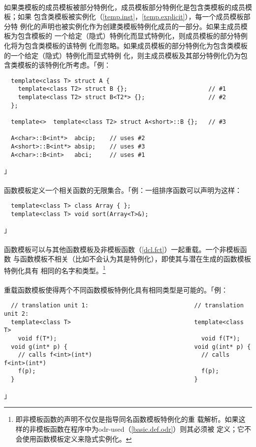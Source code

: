 \paragraph{}
如果类模板的成员模板被部分特例化，成员模板部分特例化是包含类模板的成员模板；如果
包含类模板被实例化（\ref{temp.inst}，\ref{temp.explicit}），每一个成员模板部分特
例化的声明也被实例化作为创建类模板特例化成员的一部分。如果主成员模板为包含模板的
一个给定（隐式）特例化而显式特例化，则成员模板的部分特例化将为包含类模板的该特例
化而忽略。如果成员模板的部分特例化为包含类模板的一个给定（隐式）特例化而显式特例
化，则主成员模板及其部分特例化仍为包含类模板的该特例化所考虑。「例：
\begin{lstlisting}
  template<class T> struct A {
    template<class T2> struct B {};                       // #1
    template<class T2> struct B<T2*> {};                  // #2
  };

  template<>  template<class T2> struct A<short>::B {};   // #3

  A<char>::B<int*>  abcip;    // uses #2
  A<short>::B<int*> absip;    // uses #3
  A<char>::B<int>   abci;     // uses #1
\end{lstlisting}」

\paragraph{}
函数模板定义一个相关函数的无限集合。「例：一组排序函数可以声明为这样：
\begin{lstlisting}
  template<class T> class Array { };
  template<class T> void sort(Array<T>&);
\end{lstlisting}」

\paragraph{}
函数模板可以与其他函数模板及非模板函数（\ref{dcl.fct}）一起重载。一个非模板函数
与函数模板不相关（比如不会认为其是特例化），即使其与潜在生成的函数模板特例化具有
相同的名字和类型。\footnote{即非模板函数的声明不仅仅是指导同名函数模板特例化的重
载解析。如果这样的非模板函数在程序中为odr-used（\ref{basic.def.odr}）则其必须被
定义；它不会使用函数模板定义来隐式实例化。}

\paragraph{}
重载函数模板使得两个不同函数模板特例化具有相同类型是可能的。「例：
\begin{lstlisting}
  // translation unit 1:                              // translation unit 2:
  template<class T>                                   template<class T>
    void f(T*);                                         void f(T*);
  void g(int* p) {                                    void g(int* p) {
    // calls f<int>(int*)                               // calls f<int>(int*)
    f(p);                                               f(p);
  }                                                   }
\end{lstlisting}」

